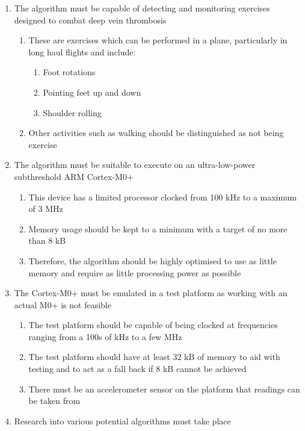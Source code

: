 \begin{enumerate}
  \item The algorithm must be capable of detecting and monitoring exercises designed to combat deep vein thrombosis
  \begin{enumerate}[label*=\arabic*.]
    \item These are exercises which can be performed in a plane, particularly in long haul flights and include:
    \begin{enumerate}[label*=\arabic*.]
      \item Foot rotations
      \item Pointing feet up and down
      \item Shoulder rolling
    \end{enumerate}
    \item Other activities such as walking should be distinguished as not being exercise
  \end{enumerate}
  \item The algorithm must be suitable to execute on an ultra-low-power subthreshold ARM Cortex-M0+
  \begin{enumerate}[label*=\arabic*.]
    \item This device has a limited processor clocked from 100 kHz to a maximum of 3 MHz
    \item Memory usage should be kept to a minimum with a target of no more than 8 kB
    \item Therefore, the algorithm should be highly optimised to use as little memory and require as little processing power as possible
  \end{enumerate}
  \item The Cortex-M0+ must be emulated in a test platform as working with an actual M0+ is not feasible
  \begin{enumerate}[label*=\arabic*.]
    \item The test platform should be capable of being clocked at frequencies ranging from a 100s of kHz to a few MHz
    \item The test platform should have at least 32 kB of memory to aid with testing and to act as a fall back if 8 kB cannot be achieved
    \item There must be an accelerometer sensor on the platform that readings can be taken from
  \end{enumerate}
  \item Research into various potential algorithms must take place
  \begin{enumerate}[label*=\arabic*.]

\end{enumerate}
\end{enumerate}
